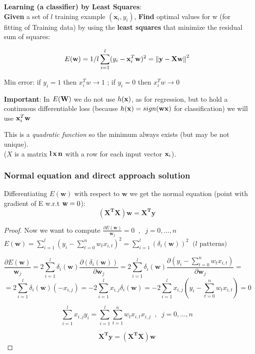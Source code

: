\documentclass[../main.tex]{subfiles}
\begin{document}
\noindent \textbf{Learning (a classifier) by Least Squares}:\\

\noindent\textbf{Given} a set of $l$ training example $( \mathbf{x}_i, y_i)$, \textbf{Find} optimal values for w (for fitting of Training data) by using the \textbf{least squares} that minimize the residual sum of squares:

$$ E(\bold{w}) = 1/l \sum_{i = 1}^{l} (y_i - \bold{x}_i^T\bold{w})^2 = \left\lVert\bold{y} - \bold{Xw} \right\rVert ^2$$

\begin{center}
    Min error: if $y_i=1$ then $x_i^Tw\rightarrow 1$ ; if $y_i=0$ then  $x_i^Tw\rightarrow 0$
\end{center} 

\textbf{Important}: In $E(\bold{W})$ we do not use $h(\bold{x})$, as for regression, but to hold a continuous differentiable loss (because $h(\bold{x})=sign(\bold{wx})$ for classification) we will use $\bold{x}_i^T\bold{w}$

This is a \emph{quadratic function} so the minimum always exists (but may be not unique).\\
($X$ is a matrix $\bold{l\, x\, n}$ with a row for each input vector $\bold{x}_i$).

\subsubsection{Normal equation and direct approach solution}
Differentiating $E(\mathbf{w})$ with respect to $\mathbf{w}$ we get the normal equation (point with gradient of E w.r.t $\bold{w} =0$):
$$ \mathbf{(X^TX)w = X^Ty}$$

\begin{proof} Now we want to compute $\frac{\partial E(\mathbf{w})}{\mathbf{w}_j} = 0 \;\; , \;\; j = 0, \dots, n$\\

$E(\mathbf{w}) = \sum_{i = 1}^{l}(y_i - \sum_{t = 0}^{n} w_t x_{i,t} )^2 =  \sum_{i = 1}^{l} (\delta_i(\mathbf{w}))^2 \;\;   \text{($l$ patterns)}$

$$\frac{\partial E(\mathbf{w})}{\mathbf{w}_j} = 2\sum_{i = 1}^{l} \delta_i(\mathbf{w}) \frac{\partial (\delta_i(\mathbf{w}))}{\partial \mathbf{w}_j} =   2\sum_{i = 1}^{l} \delta_i(\mathbf{w}) \frac{\partial (y_i - \sum_{t = 0}^{n} w_t x_{i,t} )}{\partial \mathbf{w}_j}=\quad  \quad$$
$$=2\sum_{i = 1}^{l} \delta_i(\mathbf{w}) (-x_{i,j}) = -2\sum_{i = 1}^{l} x_{i,j} \delta_i(\mathbf{w}) =
-2\sum_{i = 1}^{l} x_{i,j}(y_i - \sum_{t = 0}^{n} w_t x_{i,t} )  = 0
$$

$$\sum_{i = 1}^{l}x_{i,j}y_i = \sum_{i = 1}^{l}\sum_{t = 1}^{n} w_t x_{i,t} x_{i,j}  \;\; , \;\; j = 0, \dots, n$$

$$ \mathbf{X^Ty = (X^TX)w}$$
\end{proof}
\end{document}
